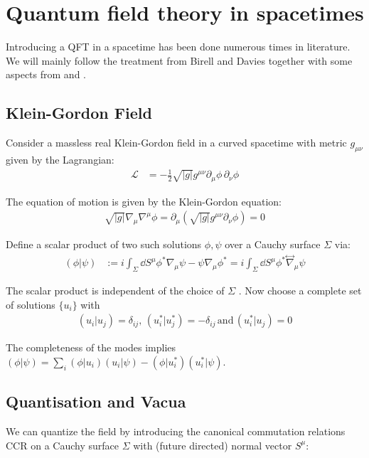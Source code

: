 \chapter{Quantum field theory in spacetimes}

Introducing a QFT in a spacetime has been done numerous times in literature. We will mainly follow the treatment from Birell and Davies \cite{davies} together with some aspects from \cite{krishnan1011.5875} and \cite{Townsend}.    

\section{Klein-Gordon Field}
Consider a massless real Klein-Gordon field in a curved spacetime with metric \(g_{\mu\nu}\) given by the Lagrangian:
\begin{align}
\mathcal{L} &= -\frac{1}{2}\sqrt{|g|} g^{\mu\nu} \partial_\mu \phi\,\partial_\nu \phi 
\end{align}

The equation of motion is given by the Klein-Gordon equation:
\begin{align}
\sqrt{|g|}\nabla_\mu\nabla^\mu \phi = \partial_\mu \left(\sqrt{|g|} g^{\mu\nu} \partial_\nu \phi\right) = 0
\end{align}

Define a scalar product of two such solutions $\phi, \psi$ over a Cauchy surface \(\Sigma\) via:
\begin{align}
(\phi|\psi) &:= i \int_{\Sigma}\dd{S^\mu} \phi^*\nabla_\mu \psi - \psi\nabla_\mu \phi^* = i \int_{\Sigma} \dd{S^\mu} \phi^*\overset{\leftrightarrow}{\nabla}_\mu \psi
\end{align}

The scalar product is independent of the choice of \(\Sigma\) \cite{Townsend}. Now choose a complete set of solutions \(\{u_i\}\) with
\begin{align}
(u_i| u_j) = \delta_{ij},\,(u_i^*| u_j^*) = -\delta_{ij}\,\text{and}\,(u_i^*| u_j) = 0
\end{align}

The completeness of the modes implies \((\phi|\psi) = \sum_i (\phi|u_i)(u_i|\psi) - (\phi|u_i^*)(u_i^*|\psi)\).

\section{Quantisation and Vacua}
\label{sec:qft_quantisation}
We can quantize the field by introducing the canonical commutation relations CCR on a Cauchy surface \(\Sigma\) with (future directed) normal vector $S^\mu$:

